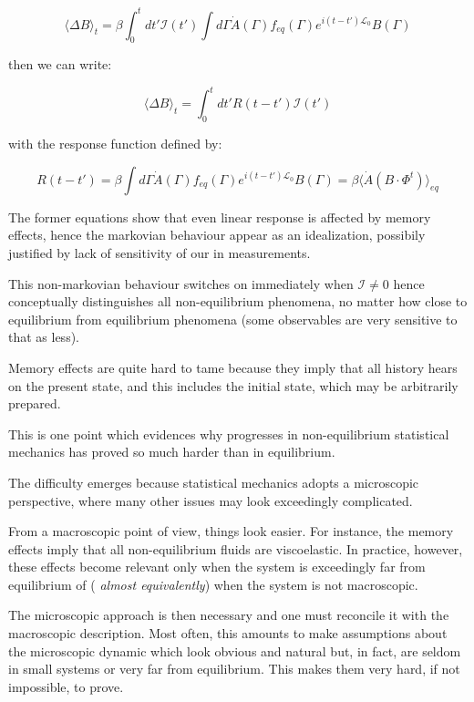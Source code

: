 \documentclass{article}
\begin{document}
\begin{equation}
	\langle \Delta B \rangle_t = \beta \int_{0}^{t} dt' \mathcal{I}(t') \int d \Gamma  \dot{A}(\Gamma) f_{eq}(\Gamma) e^{i(t-t')\mathcal{L}_0 }B(\Gamma)
\end{equation}

then we can write:

$$ \langle \Delta B \rangle_t  = \int_{0}^{t} dt' R(t-t') \mathcal{I}(t') $$

with the response function defined by:

\begin{equation}
R(t-t') = \beta \int d \Gamma  \dot{A}(\Gamma) f_{eq}(\Gamma) e^{i(t-t')\mathcal{L}_0 }B(\Gamma) = \beta \langle \dot{A} (B \cdot \Phi^t) \rangle_{eq}
\end{equation}


The former equations show that even linear response is affected by memory effects, hence the markovian behaviour appear as an idealization, possibily justified by lack of sensitivity of our in measurements.


\newpage

This non-markovian behaviour switches on immediately when $\mathcal{I} \neq 0$ hence conceptually distinguishes all non-equilibrium phenomena, no matter how close to equilibrium from equilibrium phenomena (some observables are very sensitive to that as less).

Memory effects are quite hard to tame because they imply that all history hears on the present state, and this includes the initial state, which may be arbitrarily prepared.

This is one point which evidences why progresses in non-equilibrium statistical mechanics has proved so much harder than in equilibrium.

The difficulty emerges because statistical mechanics adopts a microscopic perspective, where many other issues may look exceedingly complicated.

From a macroscopic point of view, things look easier. For instance, the memory effects imply that all non-equilibrium fluids are viscoelastic. In practice, however, these effects become relevant only when the system is exceedingly far from equilibrium of (
\emph{almost equivalently}) when the system is not macroscopic.

The microscopic approach is then necessary and one must reconcile it with the macroscopic description. Most often, this amounts to make assumptions about the microscopic dynamic which look obvious and natural but, in fact, are seldom  in small systems or very far from equilibrium. This makes them very hard, if not impossible, to prove.
\end{document}
